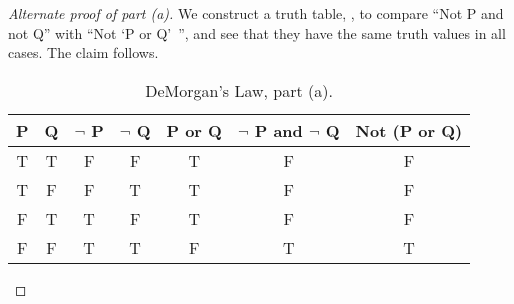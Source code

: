 \documentclass{tufte-book}
\begin{document}
\begin{proof}[Alternate proof of part (a)] 
  We construct a truth table,  , to compare ``Not P and not Q'' with ``Not `P or Q'~'', and see that they have the same truth values in all cases. The claim follows.
  \begin{table}
    \begin{center}
      \begin{tabular}{ccccccc}
        \toprule
        P & Q & $\neg$ P & $\neg$ Q & P or Q & $\neg$ P and $\neg$ Q & Not (P or Q) \\ \midrule 
        T & T & F & F & T & F & F\\
        T & F & F & T & T & F & F\\
        F & T & T & F & T & F & F\\
        F & F & T & T & F & T & T\\
        \bottomrule
      \end{tabular}
    \end{center}
    \caption{DeMorgan's Law, part (a).}
    \label{tab:demorgan-a}
  \end{table}
\end{proof}



\end{document}
